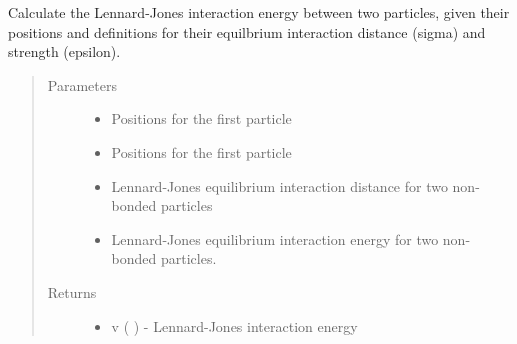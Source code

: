 \documentclass[letterpaper,12pt,english,openany,oneside]{sphinxmanual}
\begin{document}

\begin{fulllineitems}
\label{\detokenize{utilities:utilities.util.lj_v}}
Calculate the Lennard-Jones interaction energy between two particles, given their positions and definitions for their equilbrium interaction distance (sigma) and strength (epsilon).
\begin{quote}\begin{description}
\item[{Parameters}] \leavevmode\begin{itemize}
\item {} 
 \textendash{} Positions for the first particle

\item {} 
 \textendash{} Positions for the first particle

\item {} 
 \textendash{} Lennard-Jones equilibrium interaction distance for two non-bonded particles

\item {} 
 \textendash{} Lennard-Jones equilibrium interaction energy for two non-bonded particles.

\end{itemize}

\item[{Returns}] \leavevmode
\begin{itemize}
\item {} 
v (  ) - Lennard-Jones interaction energy

\end{itemize}


\end{description}\end{quote}

\end{fulllineitems}

\end{document}
